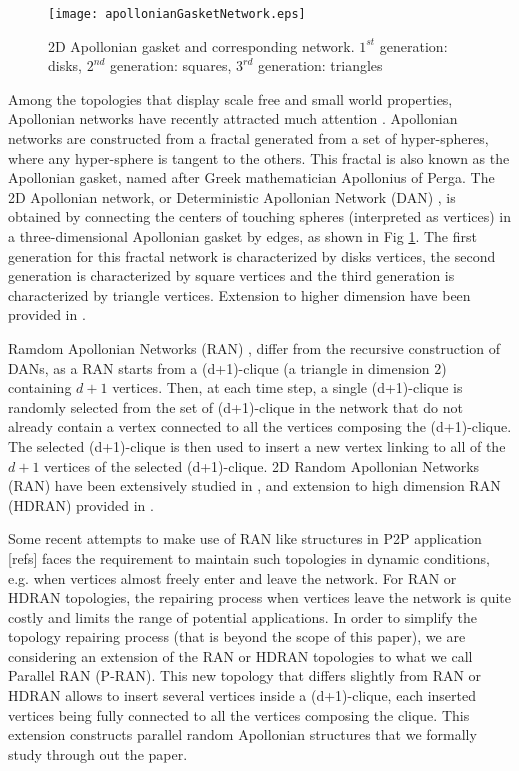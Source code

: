 \documentclass[11pt]{iopart}
\begin{document}
\begin{figure}[htbp]
\centering
\texttt{[image: apollonianGasketNetwork.eps]}
\caption{2D Apollonian gasket and corresponding network. $1^{st}$ generation: disks, $2^{nd}$ generation: squares, $3^{rd}$ generation: triangles}
\label{apollonianGasketNetwork}
\end{figure}

Among the topologies that display scale free and small world properties, Apollonian networks \cite{PhysRevLett.94.018702} have recently attracted much attention \cite{pellegrini-2007,huang-2006-51}. Apollonian networks are constructed from a fractal generated from a set of hyper-spheres, where any hyper-sphere is tangent to the others. This fractal is also known as the Apollonian gasket, named after Greek mathematician Apollonius of Perga. The 2D Apollonian network, or Deterministic Apollonian Network (DAN) \cite{PhysRevLett.94.018702}, is obtained by connecting the centers of touching spheres (interpreted as vertices) in a three-dimensional Apollonian gasket by edges, as shown in Fig \ref{apollonianGasketNetwork}. The first generation for this fractal network is characterized by disks vertices, the second generation is characterized by square vertices and the third generation is characterized by triangle vertices. Extension to higher dimension have been provided in \cite{HDAN}.

Ramdom Apollonian Networks (RAN) \cite{zhou-2004}, differ from the recursive construction of DANs, as a RAN starts from a (d+1)-clique (a triangle in dimension $2$) containing $d+1$ vertices. Then, at each time step, a single (d+1)-clique is randomly selected from the set of (d+1)-clique in the network that do not already contain a vertex connected to all the vertices composing the (d+1)-clique. The selected (d+1)-clique is then used to insert a new vertex linking to all of the $d+1$ vertices of the selected (d+1)-clique. 2D Random Apollonian Networks (RAN) have been extensively studied in \cite{zhou-2004,zhang-2007-380}, and extension to high dimension RAN (HDRAN) provided in \cite{HDRAN}.

Some recent attempts to make use of RAN like structures in P2P application [refs] faces the requirement to maintain such topologies in dynamic conditions, e.g. when vertices almost freely enter and leave the network. For RAN or HDRAN topologies, the repairing process when vertices leave the network is quite costly and limits the range of potential applications. In order to simplify the topology repairing process (that is beyond the scope of this paper), we are considering an extension of the RAN or HDRAN topologies to what we call Parallel RAN (P-RAN). This new topology that differs slightly from RAN or HDRAN allows to insert several vertices inside a (d+1)-clique, each inserted vertices being fully connected to all the vertices composing the clique. This extension constructs parallel random Apollonian structures that we formally study through out the paper.
\end{document}
